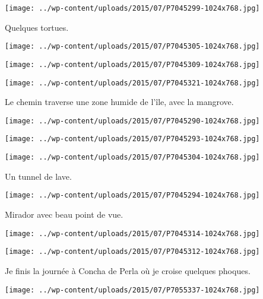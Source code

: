  \newline
 \newline
\centerline{\texttt{[image: ../wp-content/uploads/2015/07/P7045299-1024x768.jpg]} } 
 \newline
 Quelques tortues. \newline
 \newline
\centerline{\texttt{[image: ../wp-content/uploads/2015/07/P7045305-1024x768.jpg]} } 
 \newline
 \newline
\centerline{\texttt{[image: ../wp-content/uploads/2015/07/P7045309-1024x768.jpg]} } 
 \newline
 \newline
\centerline{\texttt{[image: ../wp-content/uploads/2015/07/P7045321-1024x768.jpg]} } 
 \newline
 Le chemin traverse une zone humide de l'île, avec la mangrove. \newline
 \newline
\centerline{\texttt{[image: ../wp-content/uploads/2015/07/P7045290-1024x768.jpg]} } 
 \newline
 \newline
\centerline{\texttt{[image: ../wp-content/uploads/2015/07/P7045293-1024x768.jpg]} } 
 \newline
 \newline
\centerline{\texttt{[image: ../wp-content/uploads/2015/07/P7045304-1024x768.jpg]} } 
 \newline
 Un tunnel de lave. \newline
 \newline
\centerline{\texttt{[image: ../wp-content/uploads/2015/07/P7045294-1024x768.jpg]} } 
 \newline
 Mirador avec beau point de vue. \newline
 \newline
\centerline{\texttt{[image: ../wp-content/uploads/2015/07/P7045314-1024x768.jpg]} } 
 \newline
 \newline
\centerline{\texttt{[image: ../wp-content/uploads/2015/07/P7045312-1024x768.jpg]} } 
 \newline
 Je finis la journée à Concha de Perla où je croise quelques phoques. \newline
 \newline
\centerline{\texttt{[image: ../wp-content/uploads/2015/07/P7055337-1024x768.jpg]} } 
